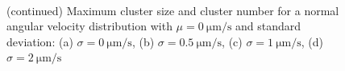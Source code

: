 \documentclass[../../master_thesis_np.tex]{subfiles}
\begin{document}
		\begin{figure}
		\centering
		\ContinuedFloat
			\\
			
			\caption{(continued) Maximum cluster size and cluster number for a normal angular velocity distribution with $\mu = \SI{0}{\um\per\second}$ and standard deviation: (a) $\sigma = \SI{0}{\um\per\second}$, (b) $\sigma = \SI{0.5}{\um\per\second}$, (c) $\sigma = \SI{1}{\um\per\second}$, (d) $\sigma = \SI{2}{\um\per\second}$}
			\label{fig:lj_av_clust}
		\end{figure}
		
\end{document}
